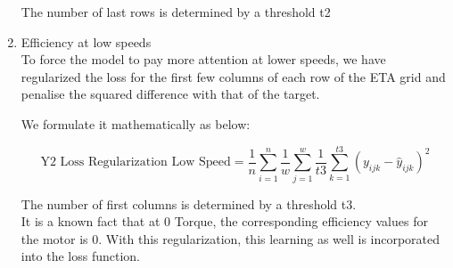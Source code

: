 \documentclass{report} %
\begin{document}
\begin{enumerate}

\vspace{0.2cm} %


The number of last rows is determined by a threshold t2

\item Efficiency at low speeds \\

To force the model to pay more attention at lower speeds, we have regularized the loss for the first few columns of each row of the ETA grid and penalise the squared difference with that of the target.

We formulate it mathematically as below:

\begin{equation}
    \text{Y2 Loss Regularization Low Speed} = \frac{1}{n} \sum_{i=1}^{n} \frac{1}{w} \sum_{j=1}^{w} \frac{1}{t3} \sum_{k=1}^{t3} (y_{ijk} - \hat{y}_{ijk})^2
    \label{eq:Y2_Loss_Regularization_Low_Speed}
\end{equation}


\vspace{0.2cm} %

The number of first columns is determined by a threshold t3. \\
It is a known fact that at 0 Torque, the corresponding efficiency values for the motor is 0. With this regularization, this learning as well is incorporated into the loss function.\\


\end{enumerate}
\end{document}
